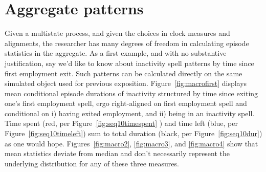 \documentclass{article}
\begin{document}
\section{Aggregate patterns}
Given a multistate process, and given the choices in clock measures and
alignments, the researcher has many degrees of freedom in calculating episode
statistics in the aggregate. As a first example, and with no substantive
justification, say we'd like to know about inactivity spell patterns by time
since first employment exit. Such patterns can be calculated directly on the
same simulated object used for previous exposition.
Figure~\ref{fig:macrofirst} displays mean conditional episode durations of
inactivity structured by time since exiting one's first employment spell, ergo
right-aligned on first employment spell and conditional on i) having exited
employment, and ii) being in an inactivity spell. Time spent (red, per
Figure~\ref{fig:seq10timespent} ) and time left (blue, per
Figure~\ref{fig:seq10timeleft}) sum to total duration
(black, per
Figure~\ref{fig:seq10dur}) as one would hope.
Figures~\ref{fig:macro2}, \ref{fig:macro3}, and \ref{fig:macro4} show that mean
statistics deviate from median and don't necessarily represent the underlying
distribution for any of these three measures. 
\end{document}

